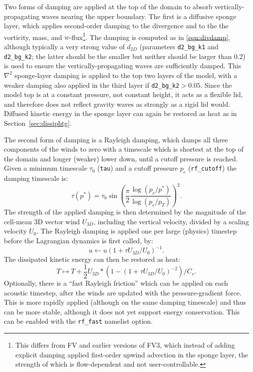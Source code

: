 \documentclass[10pt,letterpaper,margin=1in]{memoir}
\begin{document}
Two forms of damping are applied at the top of the domain to absorb vertically-propagating waves nearing the upper boundary. The first is a diffusive sponge layer, which applies second-order damping to the divergence and to the the vorticity, mass, and $w$-flux\footnote{This differs from FV and earlier versions of FV3, which instead of adding explicit damping applied first-order upwind advection in the sponge layer, the strength of which is flow-dependent and not user-controllable.}.  The damping is computed as in \eqref{eqn:divdamp}, although typically a very strong value of $d_{2D}$ (parameters \texttt{d2_bg_k1} and \texttt{d2_bg_k2}; the latter should be the smaller but neither should be larger than 0.2) is used to ensure the vertically-propagating waves are sufficiently damped. This $\nabla^2$ sponge-layer damping is applied to the top two layers of the model, with a weaker damping also applied in the third layer if \texttt{d2_bg_k2}$> 0.05$. Since the model top is at a constant pressure, not constant height, it acts as a flexible lid, and therefore does not reflect gravity waves as strongly as a rigid lid would. Diffused kinetic energy in the sponge layer can again be restored as heat as in Section~\ref{sec:dissiphtg}.

The second form of damping is a Rayleigh damping, which damps all three components of the winds to zero with a timescale which is shortest at the top of the domain and longer (weaker) lower down, until a cutoff pressure is reached. Given a minimum timescale $\tau_0$ (\texttt{tau}) and a cutoff pressure $p_c$ (\texttt{rf_cutoff}) the damping timescale is:
\begin{equation}
\tau \left(p^*\right) = \tau_0 \sin \left ( \frac{\pi}{2} \frac{\log(p_c/p^*) }{\log(p_c/p_T)} \right )^2 .
\end{equation}
The strength of the applied damping is then determined by the magnitude of the cell-mean 3D vector wind $U_{3D}$, including the vertical velocity, divided by a scaling velocity $U_0$. The Rayleigh damping is applied one per large (physics) timestep before the Lagrangian dynamics is first called, by:
\begin{equation}
u \leftarrow u \left ( 1 + \tau U_{3D}/U_0  \right )^{-1}.
\end{equation}
The dissipated kinetic energy can then be restored as heat:
\begin{equation}
T \mapsto T + \frac{1}{2} U_{3D}* \left ( 1 - \left ( 1 + \tau U_{3D}/U_0 \right )^{-2} \right )  / C_v.
\end{equation}
Optionally, there is a ``fast Rayleigh friction'' which can be applied on each acoustic timestep, after the winds are updated with the pressure-gradient force. This is more rapidly applied (although on the same damping timescale) and thus can be more stable, although it does not yet support energy conservation. This can be enabled with the \texttt{rf_fast} namelist option.
\end{document}
